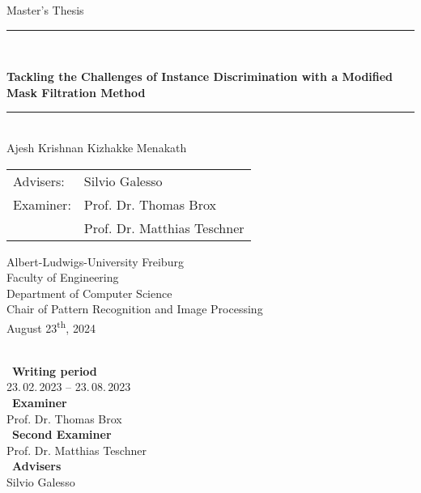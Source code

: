 
\begin{titlepage}
\begin{center}

\newcommand{\HorizontalLine}{\rule{\linewidth}{0.3mm}}

{\Large Master's Thesis}\\[1.3cm]


\HorizontalLine \\[0.4cm]
\begin{spacing}{2
}
    {\huge \bfseries Tackling the Challenges of Instance Discrimination with a Modified Mask Filtration Method} \\
\end{spacing}
\HorizontalLine \\[1.5cm]


{\Huge Ajesh Krishnan Kizhakke Menakath} \\[2cm]


\begin{tabular}[hc]{>{\huge}l >{\huge}l}
  
  Advisers: & Silvio Galesso \\[1.2cm]
  Examiner: & Prof. Dr. Thomas Brox \\[0.2cm]
    &          Prof. Dr. Matthias Teschner \\[0.3cm]
\end{tabular}
\vfill  %

\Large {
    Albert-Ludwigs-University Freiburg\\
    Faculty of Engineering\\
    Department of Computer Science\\
    Chair of Pattern Recognition and Image Processing\\[1cm]

    August 23\textsuperscript{th}, 2024\\
}
\end{center}
\end{titlepage}

\ \vfill \ \\  %
\
\textbf{Writing period}            \smallskip{} \\
23.\,02.\,2023 -- 23.\,08.\,2023   \bigskip{} \\
\
\textbf{Examiner}                  \smallskip{} \\
Prof. Dr. Thomas Brox              \bigskip{} \\
\
\textbf{Second Examiner}                  \smallskip{} \\
Prof. Dr. Matthias Teschner           \bigskip{} \\
\
\textbf{Advisers}                  \smallskip{} \\
Silvio Galesso
